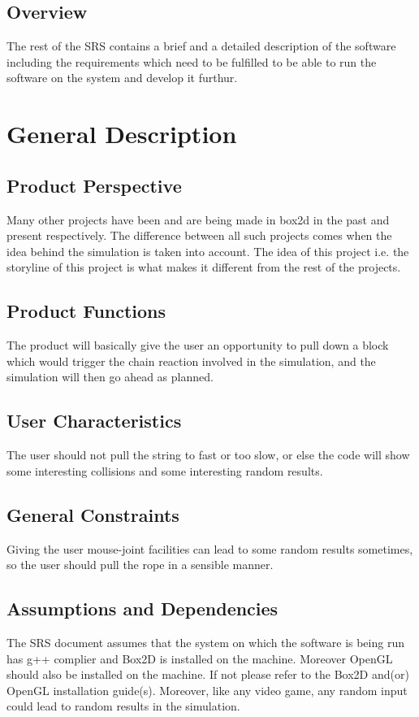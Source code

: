 \documentclass[12pt, a4paper]{article}
\begin{document}
\subsection{Overview}
The rest of the SRS contains a brief and a detailed description of the software including the requirements which need to be fulfilled to be able to run the software on the system and develop it furthur.

\pagebreak
\section{General Description}
\subsection{Product Perspective}
Many other projects have been and are being made in box2d in the past and present respectively. The difference between all such projects comes when the idea behind the simulation is taken into account. The idea of this project i.e. the storyline of this project is what makes it different from the rest of the projects.  

\subsection{Product Functions}
The product will basically give the user an opportunity to pull down a block which would trigger the chain reaction involved in the simulation, and the simulation will then go ahead as planned.

\subsection{User Characteristics}
The user should not pull the string to fast or too slow, or else the code will show some interesting collisions and some interesting random results.   

\subsection{General Constraints}
Giving the user mouse-joint facilities can lead to some random results sometimes, so the user should pull the rope in a sensible manner.

\subsection{Assumptions and Dependencies}
The SRS document assumes that the system on which the software is being run has g++ complier and Box2D is installed on the machine. Moreover OpenGL should also be installed on the machine. If not please refer to the Box2D and(or) OpenGL installation guide(s). Moreover, like any video game, any random input could lead to random results in the simulation.
\end{document}
